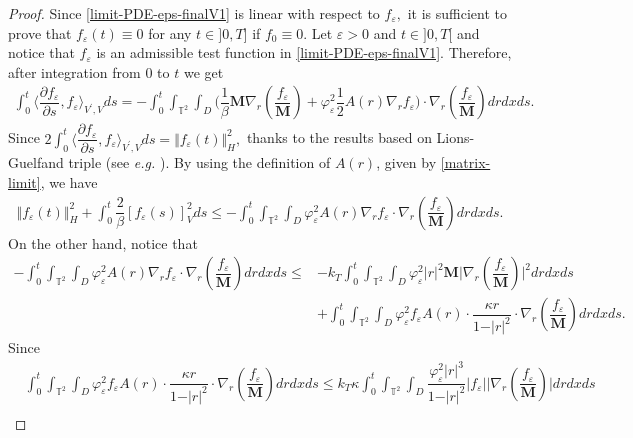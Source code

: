 \documentclass[a4paper,12pt, reqno]{amsart}
\begin{document}
  \begin{proof}
      Since \eqref{limit-PDE-eps-finalV1} is linear with respect to $f_\varepsilon,$ it is sufficient to prove that $f_\varepsilon(t)\equiv 0$ for any $t\in ]0,T]$ if $f_0\equiv 0$. Let $\varepsilon>0$ and $t\in ]0,T[$ and notice that $f_\varepsilon$ is an admissible test function in \eqref{limit-PDE-eps-finalV1}. Therefore, after integration from $0$ to $t$ we get 
       \begin{align*}
    \int_0^t\langle\dfrac{\partial f_\varepsilon}{\partial s},f_\varepsilon\rangle_{V^\prime,V}ds=-\int_0^t\int_{\mathbb{T}^2}\int_D\big ( \dfrac{1}{\beta}\mathbf{M}\nabla_r(\dfrac{f_\varepsilon}{\mathbf{M}})+ \varphi_\varepsilon^2\dfrac{1}{2} A(r) \nabla_rf_\varepsilon\big)\cdot \nabla_r(\dfrac{f_\varepsilon}{\mathbf{M}}) drdxds.
\end{align*}
Since $2\displaystyle\int_0^t\langle\dfrac{\partial f_\varepsilon}{\partial s},f_\varepsilon\rangle_{V^\prime,V}ds=\Vert f_\varepsilon(t)\Vert_H^2,$ thanks to the  results based on  Lions-Guelfand
triple (see \textit{e.g.} \cite[Theorem 3.1.]{Lions-Magenes}). By using the definition of $A(r)$, given by \eqref{matrix-limit}, we have
\begin{align*}
    \Vert f_\varepsilon(t)\Vert_H^2+\int_0^t \dfrac{2}{\beta}[f_\varepsilon(s)]_V^2 ds \leq -\int_0^t\int_{\mathbb{T}^2}\int_D \varphi_\varepsilon^2 A(r) \nabla_rf_\varepsilon\cdot \nabla_r(\dfrac{f_\varepsilon}{\mathbf{M}}) drdxds.
\end{align*}
On the other hand, notice that
\begin{align*}
-\int_0^t\int_{\mathbb{T}^2}\int_D \varphi_\varepsilon^2 A(r) \nabla_rf_\varepsilon\cdot \nabla_r(\dfrac{f_\varepsilon}{\mathbf{M}}) drdxds \leq& -k_T\int_0^t\int_{\mathbb{T}^2}\int_D  \varphi_\varepsilon^2\vert r\vert^2\mathbf{M} \vert \nabla_r(\dfrac{f_\varepsilon}{\mathbf{M}})\vert^2 drdxds\\&+\int_0^t\int_{\mathbb{T}^2}\int_D \varphi_\varepsilon^2 f_\varepsilon A(r)\cdot \dfrac{\kappa r}{1-\vert r\vert^2} \cdot \nabla_r(\dfrac{f_\varepsilon}{\mathbf{M}}) drdxds.
\end{align*}
Since 
\begin{align*}
    &\int_0^t\int_{\mathbb{T}^2}\int_D \varphi_\varepsilon^2 f_\varepsilon A(r)\cdot \dfrac{\kappa r}{1-\vert r\vert^2} \cdot \nabla_r(\dfrac{f_\varepsilon}{\mathbf{M}}) drdxds \leq k_T\kappa   \int_0^t\int_{\mathbb{T}^2}\int_D\dfrac{\varphi_\varepsilon^2  \vert r\vert^3}{1-\vert r\vert^2} \vert f_\varepsilon\vert \vert \nabla_r(\dfrac{f_\varepsilon}{\mathbf{M}})\vert drdxds\\

\end{align*}
\end{proof}
\end{document}
